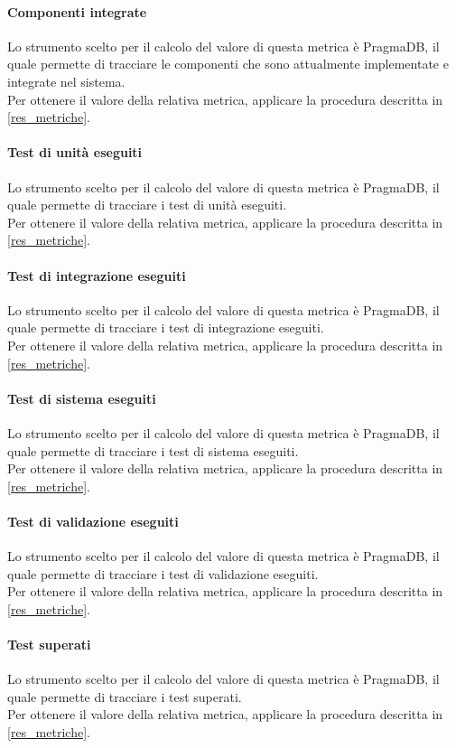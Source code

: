 \paragraph{Componenti integrate}
Lo strumento scelto per il calcolo del valore di questa metrica è PragmaDB, il quale permette di tracciare le componenti che sono attualmente implementate e integrate nel sistema.\\
Per ottenere il valore della relativa metrica, applicare la procedura descritta in \ref{res_metriche}.
\paragraph{Test di unità eseguiti}
Lo strumento scelto per il calcolo del valore di questa metrica è PragmaDB, il quale permette di tracciare i test di unità eseguiti.\\
Per ottenere il valore della relativa metrica, applicare la procedura descritta in \ref{res_metriche}.
\paragraph{Test di integrazione eseguiti}
Lo strumento scelto per il calcolo del valore di questa metrica è PragmaDB, il quale permette di tracciare i test di integrazione eseguiti.\\
Per ottenere il valore della relativa metrica, applicare la procedura descritta in \ref{res_metriche}.
\paragraph{Test di sistema eseguiti}
Lo strumento scelto per il calcolo del valore di questa metrica è PragmaDB, il quale permette di tracciare i test di sistema eseguiti.\\
Per ottenere il valore della relativa metrica, applicare la procedura descritta in \ref{res_metriche}.
\paragraph{Test di validazione eseguiti}
Lo strumento scelto per il calcolo del valore di questa metrica è PragmaDB, il quale permette di tracciare i test di validazione eseguiti.\\
Per ottenere il valore della relativa metrica, applicare la procedura descritta in \ref{res_metriche}.
\paragraph{Test superati}
Lo strumento scelto per il calcolo del valore di questa metrica è PragmaDB, il quale permette di tracciare i test superati.\\
Per ottenere il valore della relativa metrica, applicare la procedura descritta in \ref{res_metriche}.
